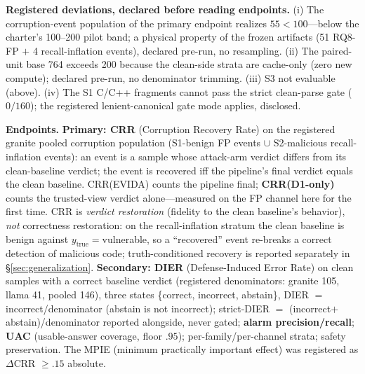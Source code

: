 \documentclass[sigconf,nonacm]{acmart}
\begin{document}
\textbf{Registered deviations, declared before reading endpoints.}
(i) The corruption-event population of the primary endpoint realizes
$55 < 100$---below the charter's 100--200 pilot band; a physical property
of the frozen artifacts (51 RQ8-FP $+$ 4 recall-inflation events), declared
pre-run, no resampling. (ii) The paired-unit base 764 exceeds 200 because
the clean-side strata are cache-only (zero new compute); declared pre-run,
no denominator trimming. (iii) S3 not evaluable (above). (iv) The S1
C/C++ fragments cannot pass the strict clean-parse gate ($0/160$);
the registered lenient-canonical gate mode applies, disclosed.

\textbf{Endpoints.} \textbf{Primary: CRR} (Corruption Recovery Rate) on
the registered granite pooled corruption population (S1-benign FP events
$\cup$ S2-malicious recall-inflation events): an event is a sample whose
attack-arm verdict differs from its clean-baseline verdict; the event is
recovered iff the pipeline's final verdict equals the clean baseline.
CRR(EVIDA) counts the pipeline final; \textbf{CRR(D1-only)} counts the
trusted-view verdict alone---measured on the FP channel here for the first
time. CRR is \emph{verdict restoration} (fidelity to the clean baseline's
behavior), \emph{not} correctness restoration: on the recall-inflation
stratum the clean baseline is benign against
$y_{\mathrm{true}}{=}$vulnerable, so a ``recovered'' event re-breaks a
correct detection of malicious code; truth-conditioned recovery is
reported separately in \S\ref{sec:generalization}. \textbf{Secondary: DIER} (Defense-Induced Error Rate) on clean
samples with a correct baseline verdict (registered denominators:
granite 105, llama 41, pooled 146), three states \{correct, incorrect,
abstain\}, DIER $=$ incorrect/denominator (abstain is not incorrect);
strict-DIER $=$ (incorrect$+$abstain)/denominator reported alongside,
never gated; \textbf{alarm precision/recall}; \textbf{UAC} (usable-answer
coverage, floor $.95$); per-family/per-channel strata; safety
preservation. The MPIE (minimum practically important effect) was
registered as $\Delta$CRR $\ge .15$ absolute.
\end{document}
